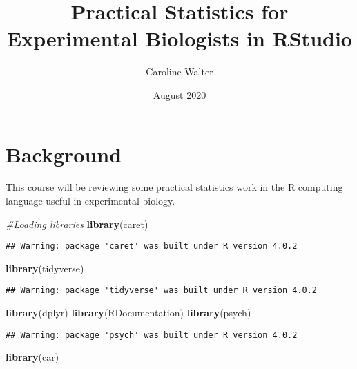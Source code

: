 \documentclass[]{article}
\title{Practical Statistics for Experimental Biologists in RStudio}
\author{Caroline Walter}
\date{August 2020}
\newenvironment{Shaded}{\begin{snugshade}}{\end{snugshade}}
\newcommand{\CommentTok}[1]{\textcolor[rgb]{0.56,0.35,0.01}{\textit{#1}}}
\newcommand{\KeywordTok}[1]{\textcolor[rgb]{0.13,0.29,0.53}{\textbf{#1}}}
\newcommand{\NormalTok}[1]{#1}
\begin{document}
\maketitle

{
\setcounter{tocdepth}{3}
\tableofcontents
}
\hypertarget{background}{%
\section{Background}\label{background}}

This course will be reviewing some practical statistics work in the R
computing language useful in experimental biology.

\begin{Shaded}
\begin{Highlighting}[]
\CommentTok{#Loading libraries}
\KeywordTok{library}\NormalTok{(caret)}
\end{Highlighting}
\end{Shaded}

\begin{verbatim}
## Warning: package 'caret' was built under R version 4.0.2
\end{verbatim}

\begin{Shaded}
\begin{Highlighting}[]
\KeywordTok{library}\NormalTok{(tidyverse)}
\end{Highlighting}
\end{Shaded}

\begin{verbatim}
## Warning: package 'tidyverse' was built under R version 4.0.2
\end{verbatim}

\begin{Shaded}
\begin{Highlighting}[]
\KeywordTok{library}\NormalTok{(dplyr)}
\KeywordTok{library}\NormalTok{(RDocumentation)}
\KeywordTok{library}\NormalTok{(psych)}
\end{Highlighting}
\end{Shaded}

\begin{verbatim}
## Warning: package 'psych' was built under R version 4.0.2
\end{verbatim}

\begin{Shaded}
\begin{Highlighting}[]
\KeywordTok{library}\NormalTok{(car)}
\end{Highlighting}
\end{Shaded}
\end{document}
